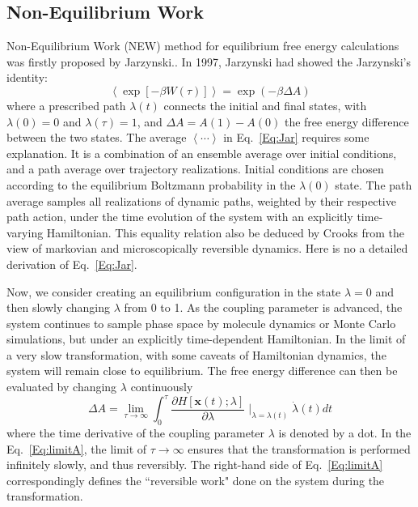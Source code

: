 \subsection{Non-Equilibrium Work\label{Sec:FEM:NEW}}
Non-Equilibrium Work (NEW) method for equilibrium free energy calculations was firstly proposed by Jarzynski.\cite{JarzynskiPRL1997}. 
In 1997, Jarzynski had showed the Jarzynski's identity:
\begin{equation}
\left \langle \exp[-\beta W(\tau)] \right \rangle = \exp(-\beta \Delta A) 
\label{Eq:Jar}
\end{equation} 
where a prescribed path $\lambda(t)$ connects the initial and final states, with $\lambda(0)=0$ and $\lambda(\tau)=1$, and $\Delta A = A(1) - A(0)$ the free energy difference between the two states. The average $\left \langle \cdots \right \rangle$ in Eq.~\ref{Eq:Jar} requires some explanation. It is a combination of an ensemble average over initial conditions, and a path average over trajectory realizations. Initial conditions are chosen according to the equilibrium Boltzmann probability in the $\lambda(0)$ state. The path average samples all realizations of dynamic paths, weighted by their respective path action, under the time evolution of the system with an explicitly time-varying Hamiltonian. This equality relation also be deduced by Crooks from the view of markovian and microscopically reversible dynamics.\cite{CrooksJSP1998} Here is no a detailed derivation of Eq.~\ref{Eq:Jar}.

Now, we consider creating an equilibrium configuration in the state $\lambda=0$ and then slowly changing $\lambda$ from 0 to 1. As the coupling parameter is advanced, the system continues to sample phase space by molecule dynamics or Monte Carlo simulations, but under an explicitly time-dependent Hamiltonian. In the limit of a very slow transformation, with some caveats of Hamiltonian dynamics, the system will remain close to equilibrium. The free energy difference can then be evaluated by changing $\lambda$ continuously
\begin{equation}
\Delta A =\lim_{\tau\to\infty} \int_{0}^{\tau} \frac{\partial{H[\textbf{x}(t);\lambda]}}{\partial{\lambda}}\mid_ {\lambda=\lambda(t)} \dot{\lambda}(t) dt
\label{Eq:limitA}
\end{equation}  
where the time derivative of the coupling parameter $\lambda$ is denoted by a dot. In the Eq.~\ref{Eq:limitA}, the limit of $\tau\to\infty$ ensures that the transformation is performed infinitely slowly, and thus reversibly. The right-hand side of Eq.~\ref{Eq:limitA} correspondingly defines the ``reversible work" done on the system during the transformation.

